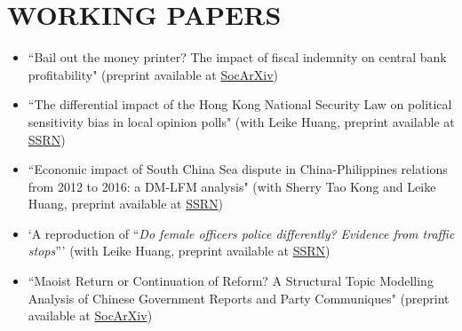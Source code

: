 \documentclass[a4paper,9pt]{extarticle}
\begin{document}
\section*{WORKING PAPERS}
\begin{itemize}
    \item ``Bail out the money printer? The impact of fiscal indemnity on central bank profitability" (preprint available at \href{https://doi.org/10.31235/osf.io/wz75m}{SocArXiv})
    \item ``The differential impact of the Hong Kong National Security Law on political sensitivity bias in local opinion polls" (with Leike Huang, preprint available at \href{https://dx.doi.org/10.2139/ssrn.4499460}{SSRN})
    \item ``Economic impact of South China Sea dispute in China-Philippines relations from 2012 to 2016: a DM-LFM analysis" (with Sherry Tao Kong and Leike Huang, preprint available at \href{https://dx.doi.org/10.2139/ssrn.4623476}{SSRN})
    \item `A reproduction of ``\textit{Do female officers police differently? Evidence from traffic stops}”' (with Leike Huang, preprint available at \href{https://dx.doi.org/10.2139/ssrn.4632847}{SSRN})
    \item ``Maoist Return or Continuation of Reform? A Structural Topic Modelling Analysis of Chinese Government Reports and Party Communiques" (preprint available at \href{https://doi.org/10.31235/osf.io/62dvj}{SocArXiv})
\end{itemize}

\end{document}
